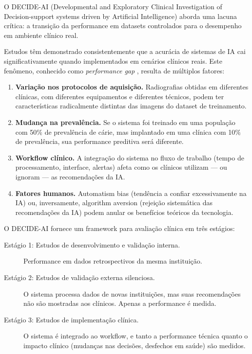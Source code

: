O DECIDE-AI  (Developmental and Exploratory Clinical Investigation of Decision-support systems driven by Artificial Intelligence) aborda uma lacuna crítica: a transição da performance em datasets controlados para o desempenho em ambiente clínico real.

Estudos têm demonstrado consistentemente que a acurácia de sistemas de IA cai significativamente quando implementados em cenários clínicos reais. Este fenômeno, conhecido como \textit{performance gap} , resulta de múltiplos fatores:

\begin{enumerate}
    \item \textbf{Variação nos protocolos de aquisição.} Radiografias obtidas em diferentes clínicas, com diferentes equipamentos e diferentes técnicos, podem ter características radicalmente distintas das imagens do dataset de treinamento.
    \item \textbf{Mudança na prevalência.} Se o sistema foi treinado em uma população com 50\% de prevalência de cárie, mas implantado em uma clínica com 10\% de prevalência, sua performance preditiva será diferente.
    \item \textbf{Workflow clínico.} A integração do sistema no fluxo de trabalho (tempo de processamento, interface, alertas) afeta como os clínicos utilizam — ou ignoram — as recomendações da IA.
    \item \textbf{Fatores humanos.} Automatism bias (tendência a confiar excessivamente na IA) ou, inversamente, algorithm aversion (rejeição sistemática das recomendações da IA) podem anular os benefícios teóricos da tecnologia.
\end{enumerate}

O DECIDE-AI fornece um framework para avaliação clínica em três estágios:

\begin{description}
    \item[Estágio 1: Estudos de desenvolvimento e validação interna.] Performance em dados retrospectivos da mesma instituição.
    \item[Estágio 2: Estudos de validação externa silenciosa.] O sistema processa dados de novas instituições, mas suas recomendações não são mostradas aos clínicos. Apenas a performance é medida.
    \item[Estágio 3: Estudos de implementação clínica.] O sistema é integrado ao workflow, e tanto a performance técnica quanto o impacto clínico (mudanças nas decisões, desfechos em saúde) são medidos.
\end{description}

